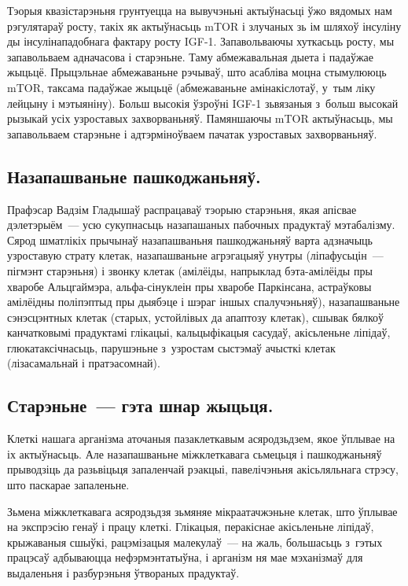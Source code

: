 Тэорыя квазістарэньня грунтуецца на вывучэньні актыўнасьці ўжо вядомых нам рэгулятараў росту, такіх як актыўнасьць mTOR і злучаных зь ім шляхоў інсуліну ды інсулінападобнага фактару росту IGF-1. Запавольваючы хуткасьць росту, мы запавольваем адначасова і старэньне. Таму абмежавальная дыета і падаўжае жыцьцё. Прыцэльнае абмежаваньне рэчываў, што асабліва моцна стымулююць mTOR, таксама падаўжае жыцьцё (абмежаваньне амінакіслотаў, у~тым ліку лейцыну і мэтыяніну). Больш высокія ўзроўні IGF-1 зьвязаныя з~больш высокай рызыкай усіх узроставых захворваньняў. Памяншаючы mTOR актыўнасьць, мы запавольваем старэньне і адтэрміноўваем пачатак узроставых захворваньняў.

\subsection*{Назапашваньне пашкоджаньняў.}

Прафэсар Вадзім Гладышаў распрацаваў тэорыю старэньня, якая апісвае дэлетэрыём~--- усю сукупнасьць назапашаных пабочных прадуктаў мэтабалізму. Сярод шматлікіх прычынаў назапашваньня пашкоджаньняў варта адзначыць узроставую страту клетак, назапашваньне агрэгацыяў унутры (ліпафусьцін~--- пігмэнт старэньня) і звонку клетак (амілёіды, напрыклад бэта-амілёіды пры хваробе Альцгаймэра, альфа-сінуклеін пры хваробе Паркінсана, астраўковы амілёідны поліпэптыд пры дыябэце і шэраг іншых спалучэньняў), назапашваньне сэнэсцэнтных клетак (старых, устойлівых да апаптозу клетак), сшывак бялкоў канчатковымі прадуктамі глікацыі, кальцыфікацыя сасудаў, акісьленьне ліпідаў, глюкатаксічнасьць, парушэньне з~узростам сыстэмаў ачысткі клетак (лізасамальнай і пратэасомнай).

\subsection*{Старэньне~--- гэта шнар жыцьця.}

Клеткі нашага арганізма аточаныя пазаклеткавым асяродзьдзем, якое ўплывае на іх актыўнасьць. Але назапашваньне міжклеткавага сьмецьця і пашкоджаньняў прыводзіць да разьвіцьця запаленчай рэакцыі, павелічэньня акісьляльнага стрэсу, што паскарае запаленьне. 


Зьмена міжклеткавага асяродзьдзя зьмяняе мікраатачжэньне клетак, што ўплывае на экспрэсію генаў і працу клеткі. Глікацыя, перакіснае акісьленьне ліпідаў, крыжаваныя сшыўкі, рацэмізацыя малекулаў~--- на жаль, большасьць з~гэтых працэсаў адбываюцца нефэрмэнтатыўна, і арганізм ня мае мэханізмаў для выдаленьня і разбурэньня ўтвораных прадуктаў.

